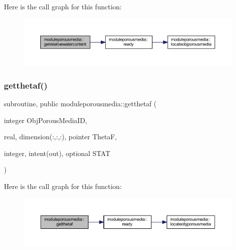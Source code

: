 Here is the call graph for this function\+:\nopagebreak
\begin{figure}[H]
\begin{center}
\leavevmode
\includegraphics[width=350pt]{namespacemoduleporousmedia_a97c2a20bb7ae4ddffb2c0f4d7586412a_cgraph}
\end{center}
\end{figure}
\mbox{\label{namespacemoduleporousmedia_a80332ae529e97e277c38798d15633046}} 
\subsubsection{\texorpdfstring{getthetaf()}{getthetaf()}}
{\footnotesize\ttfamily subroutine, public moduleporousmedia\+::getthetaf (\begin{DoxyParamCaption}\item[{integer}]{Obj\+Porous\+Media\+ID,  }\item[{real, dimension(\+:,\+:,\+:), pointer}]{ThetaF,  }\item[{integer, intent(out), optional}]{S\+T\+AT }\end{DoxyParamCaption})}

Here is the call graph for this function\+:\nopagebreak
\begin{figure}[H]
\begin{center}
\leavevmode
\includegraphics[width=350pt]{namespacemoduleporousmedia_a80332ae529e97e277c38798d15633046_cgraph}
\end{center}
\end{figure}
\mbox{\label{namespacemoduleporousmedia_a4733e16297b69cfac43e1f2f0cd30381}} 
